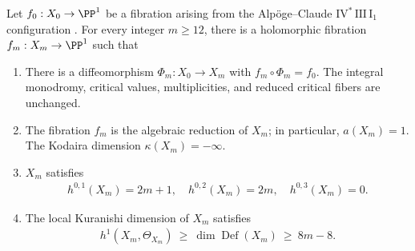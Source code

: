 \begin{theorem} 
\label{t:main}
Let $f_0:X_0\to\PP^1$ be a fibration arising from the Alp\"oge--Claude $\mathrm{IV}^*\,\mathrm{III}\,\mathrm{I}_1$ configuration \cite{AC,Engel}. For every integer $m\geq12$,  there is a holomorphic fibration
$f_m:X_m\to\PP^1$ such that
\begin{enumerate}[label=\textup{(\roman*)}]
\item There is a diffeomorphism $\Phi_m:X_0\to X_m$ with
$f_m\circ\Phi_m=f_0$. The integral monodromy, critical values,
multiplicities, and reduced critical fibers are unchanged.
\item The fibration $f_m$ is the algebraic reduction of $X_m$; in particular, $a(X_m)=1$. The Kodaira dimension $\kappa(X_m) = - \infty$.
\item $X_m$ satisfies
\begin{align}\label{newhodge}
 h^{0,1}(X_m)=2m+1,\quad h^{0,2}(X_m)=2m,\quad h^{0,3}(X_m)=0.
\end{align}
\item The local Kuranishi dimension of $X_m$ satisfies
\begin{align}\label{intromoduli}
 h^1(X_m,\Theta_{X_m})\ \geq\
 \dim\operatorname{Def}(X_m)\ \geq\ 8m -8.
\end{align}
\end{enumerate}
\end{theorem}
